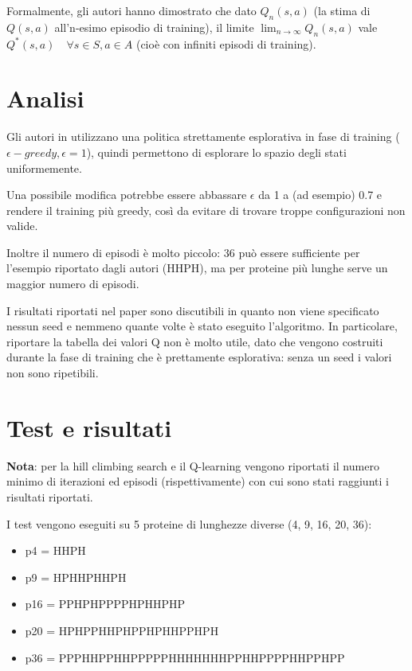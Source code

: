\documentclass[conference]{IEEEtran}
\begin{document}
Formalmente, gli autori hanno dimostrato che dato $Q_n(s, a)$ (la stima di $Q(s,a)$ all'n-esimo episodio di training), il limite $\lim_{n \to \infty} Q_n (s,a)$ vale $Q^*(s,a) \quad \forall s \in S, a \in A$ (cioè con infiniti episodi di training).

\section{Analisi}

Gli autori in \cite{CzibulaPFP} utilizzano una politica strettamente esplorativa in fase di training ($\epsilon-greedy, \epsilon = 1$), quindi permettono di esplorare lo spazio degli stati uniformemente.

Una possibile modifica potrebbe essere abbassare $\epsilon$ da 1 a (ad esempio) 0.7 e rendere il training più greedy, così da evitare di trovare troppe configurazioni non valide.

Inoltre il numero di episodi è molto piccolo: 36 può essere sufficiente per l'esempio riportato dagli autori (HHPH), ma per proteine più lunghe serve un maggior numero di episodi.

I risultati riportati nel paper sono discutibili in quanto non viene specificato nessun seed e nemmeno quante volte è stato eseguito l'algoritmo. In particolare, riportare la tabella dei valori Q non è molto utile, dato che vengono costruiti durante la fase di training che è prettamente esplorativa: senza un seed i valori non sono ripetibili.

\section{Test e risultati}

\textbf{Nota}: per la hill climbing search  e il Q-learning vengono riportati il numero minimo di iterazioni ed episodi (rispettivamente) con cui sono stati raggiunti i risultati riportati.

I test vengono eseguiti su 5 proteine di lunghezze diverse (4, 9, 16, 20, 36):

\begin{itemize}
 \item p4 = HHPH
 \item p9 = HPHHPHHPH
 \item p16 = PPHPHPPPPHPHHPHP
 \item p20 = HPHPPHHPHPPHPHHPPHPH
 \item p36 = PPPHHPPHHPPPPPHHHHHHHPPHHPPPPHHPPHPP
\end{itemize}
\end{document}
